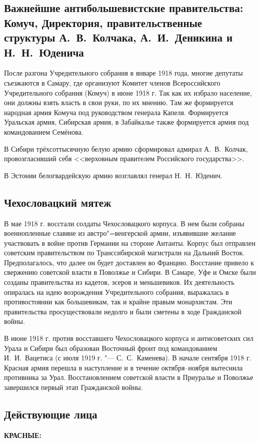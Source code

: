 \subsection{Важнейшие антибольшевистские правительства: Комуч, Директория, правительственные структуры А.~В.~Колчака, А.~И.~Деникина и Н.~Н.~Юденича}

После разгона Учредительного собрания в январе 1918 года, многие депутаты съезжаются в Самару, где организуют Комитет членов Всероссийского Учредительного собрания (Комуч) в июне 1918 г. Так как их избрало население, они должны взять власть в свои руки, по их мнению. Там же формируется народная армия Комуча под руководством генерала Капеля. Формируется Уральская армия, Сибирская армия, в Забайкалье также формируется армия под командованием Семёнова. 

В Сибири трёхсоттысячную белую армию сформировал адмирал А.~В.~Колчак, провозгласивший себя <<верховным правителем Российского государства>>.

В Эстонии белогвардейскую армию возглавлял генерал Н.~Н.~Юденич.

\subsection{Чехословацкий мятеж}

В мае 1918 г. восстали солдаты Чехословацкого корпуса. В нем были собраны
военнопленные славяне из австро"=венгерской армии, изъявившие желание участвовать в войне
против Германии на стороне Антанты. Корпус был отправлен советским правительством по
Транссибирской магистрали на Дальний Восток. Предполагалось, что далее он будет доставлен
во Францию. Восстание привело к свержению советской власти в Поволжье и Сибири. В
Самаре, Уфе и Омске были созданы правительства из кадетов, эсеров и меньшевиков. Их
деятельность опиралась на идею возрождения Учредительного собрания, выражалась в
противостоянии как большевикам, так и крайне правым монархистам. Эти правительства
просуществовали недолго и были сметены в ходе Гражданской войны.

В июне 1918 г. против восставшего Чехословацкого корпуса и антисоветских сил Урала и
Сибири был образован Восточный фронт под командованием И.~И.~Вацетиса (с июля 1919 г. "---
С.~С.~Каменева). В начале сентября 1918 г. Красная армия перешла в наступление и в течение
октября--ноября вытеснила противника за Урал. Восстановлением советской власти в
Приуралье и Поволжье завершился первый этап Гражданской войны.

\subsection{Действующие лица}
\textbf{КРАСНЫЕ:}

